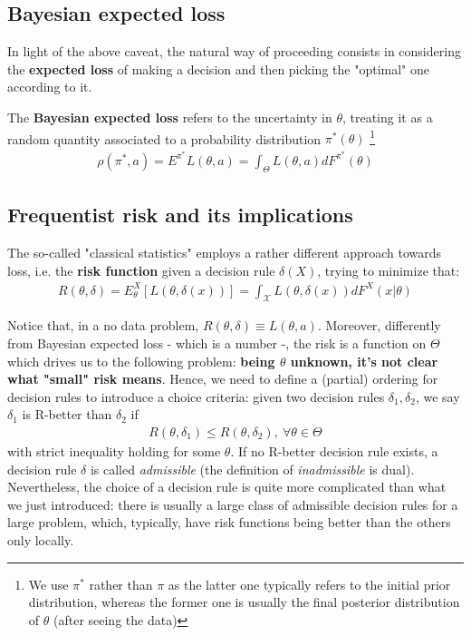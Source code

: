 \documentclass{article}
\newcommand{\loss}{L(\theta, a)}
\newcommand{\lossRule}{L(\theta, \delta(x))}
\newcommand{\risk}{R(\theta, \delta)}
\begin{document}
	\subsection{Bayesian expected loss}
	In light of the above caveat, the natural way of proceeding consists in considering the \textbf{expected loss} of making a decision and then picking the "optimal" one according to it.

	The \textbf{Bayesian expected loss} refers to the uncertainty in $\theta$, treating it as a random quantity associated to a probability distribution $\pi^*(\theta)$ \footnote{We use $\pi^*$ rather than $\pi$ as the latter one typically refers to the initial prior distribution, whereas the former one is usually the final posterior distribution of $\theta$ (after seeing the data)} 
	\begin{align*}
		\rho(\pi^*, a) = E^{\pi^*} \loss = \int_{\Theta} \loss dF^{\pi^*}(\theta)
	\end{align*}
    
	\subsection{Frequentist risk and its implications}
	The so-called "classical statistics" employs a rather different approach towards loss, i.e. the \textbf{risk function} given a decision rule $\delta(X)$, trying to minimize that:
	\begin{align*}
		\risk = E_{\theta}^{X}[\lossRule] = \int_{\mathcal{X}} \lossRule dF^X (x | \theta) 
	\end{align*}

	Notice that, in a no data problem, $\risk \equiv \loss$. Moreover, differently from Bayesian expected loss - which is a number -, the risk is a function on $\Theta$ which drives us to the following problem: \textbf{being $\theta$ unknown, it's not clear what "small" risk means}. Hence, we need to define a (partial) ordering for decision rules to introduce a choice criteria: given two decision rules $\delta_1, \delta_2$, we say $\delta_1$ is R-better than $\delta_2$ if 
	\begin{align*}
		R(\theta, \delta_1) \leq R(\theta, \delta_2), \ \forall \theta \in \Theta
	\end{align*}
	 with strict inequality holding for some $\theta$. If no R-better decision rule exists, a decision rule $\delta$ is called \textit{admissible} (the definition of \textit{inadmissible} is dual). Nevertheless, the choice of a decision rule is quite more complicated than what we just introduced: there is usually a large class of admissible decision rules for a large problem, which,
	typically, have risk functions being better than the others only locally.
	
\end{document}
